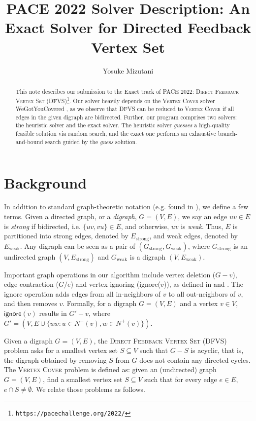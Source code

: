 \documentclass[a4paper,UKenglish,cleveref, autoref, thm-restate]{lipics-v2021}
\title{PACE 2022 Solver Description: An Exact Solver for Directed Feedback Vertex Set} %
\author{Yosuke Mizutani}{\universityOfUtah}{yos@cs.utah.edu}{https://orcid.org/0000-0002-9847-4890}{}
\begin{document}
\maketitle

\begin{abstract}
This note describes our submission to the Exact track of PACE 2022:
 \textsc{Direct Feedback Vertex Set} (\textsc{DFVS})\footnote{%
\texttt{https://pacechallenge.org/2022/}}.
Our solver heavily depends on the \textsc{Vertex Cover} solver \textsf{WeGotYouCovered}
 \cite{hespe2020wegotyoucovered},
 as we observe that \textsc{DFVS} can be reduced to \textsc{Vertex Cover}
 if all edges in the given digraph are bidirected.
%
Further, our program comprises two solvers: the heuristic solver and the exact solver.
The heuristic solver \textit{guesses} a high-quality feasible solution via random search,
 and the exact one performs an exhaustive branch-and-bound search guided by the \textit{guess} solution.
\end{abstract}

\section{Background}
\label{sec:background}

In addition to standard graph-theoretic notation (e.g. found in \cite{diestel2017graph}),
 we define a few terms.
Given a directed graph, or a \textit{digraph}, $G=(V,E)$,
 we say an edge $uv \in E$ is \textit{strong} if bidirected, i.e. $\{uv, vu\} \in E$,
 and otherwise, $uv$ is \textit{weak}.
Thus, $E$ is partitioned into strong edges, denoted by $E_\text{strong}$,
 and weak edges, denoted by $E_\text{weak}$.
%
Any digraph can be seen as a pair of $(G_\text{strong}, G_\text{weak})$,
 where $G_\text{strong}$ is an undirected graph $(V,E_\text{strong})$
 and $G_\text{weak}$ is a digraph $(V,E_\text{weak})$.

Important graph operations in our algorithm include vertex deletion ($G-v$),
 edge contraction ($G/e$) and vertex ignoring (\textsf{ignore}($v$)),
 as defined in \cite{levy_contraction_1988} and \cite{hen-ming_lin_computing_2000}.
%
The \textsf{ignore} operation adds edges from all in-neighbors of $v$ to all out-neighbors of $v$,
 and then removes $v$.
Formally, for a digraph $G=(V,E)$ and a vertex $v \in V$, $\textsf{ignore}(v)$ results in
 $G' - v$, where $G'=(V, E \cup \{uw: u \in N^-(v), w \in N^+(v) \})$.

Given a digraph $G=(V,E)$,
 the \textsc{Direct Feedback Vertex Set} (\textsc{DFVS}) problem asks for a smallest vertex set $S \subseteq V$
 such that $G-S$ is acyclic, that is, the digraph obtained by removing $S$ from $G$ does not contain
 any directed cycles.
The \textsc{Vertex Cover} problem is defined as: given an (undirected) graph $G=(V,E)$,
 find a smallest vertex set $S \subseteq V$ such that for every edge $e \in E$, $e \cap S \neq \emptyset$.
We relate those problems as follows.
\end{document}
